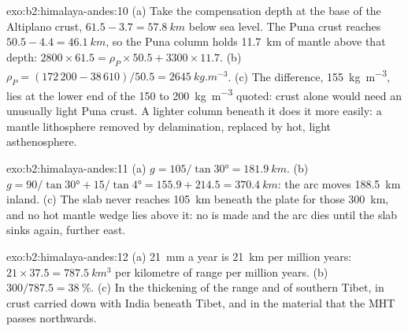 \begin{solution}{exo:b2:himalaya-andes:10}
(a) Take the compensation depth at the base of the Altiplano crust, $61.5 - 3.7 =
\qty{57.8}{km}$ below sea level. The Puna crust reaches $50.5 - 4.4 = \qty{46.1}{km}$, so the
Puna column holds \qty{11.7}{km} of mantle above that depth: $2800\times61.5 =
\rho_P\times50.5 + 3300\times11.7$. (b) $\rho_P = (172\,200 - 38\,610)/50.5 =
\qty{2645}{kg.m^{-3}}$. (c) The difference, \qty{155}{kg.m^{-3}}, lies at the lower end of
the 150 to \qty{200}{kg.m^{-3}} quoted: crust alone would need an unusually light Puna crust.
A lighter column beneath it does it more easily: a mantle lithosphere removed by delamination,
replaced by hot, light asthenosphere.
\end{solution}

\begin{solution}{exo:b2:himalaya-andes:11}
(a) $g = 105/\tan\ang{30} = \qty{181.9}{km}$. (b) $g = 90/\tan\ang{30} + 15/\tan\ang{4} =
155.9 + 214.5 = \qty{370.4}{km}$: the arc moves \qty{188.5}{km} inland. (c) The slab never
reaches \qty{105}{km} beneath the plate for those \qty{300}{km}, and no hot mantle wedge lies
above it: no  is made and the arc dies until the slab sinks again, further east.
\end{solution}

\begin{solution}{exo:b2:himalaya-andes:12}
(a) \qty{21}{mm} a year is \qty{21}{km} per million years: $21\times37.5 =
\qty{787.5}{km^3}$ per kilometre of range per million years. (b) $300/787.5 =
\qty{38}{\percent}$. (c) In the thickening of the range and of southern Tibet, in crust
carried down with India beneath Tibet, and in the material that the MHT passes northwards.
\end{solution}

